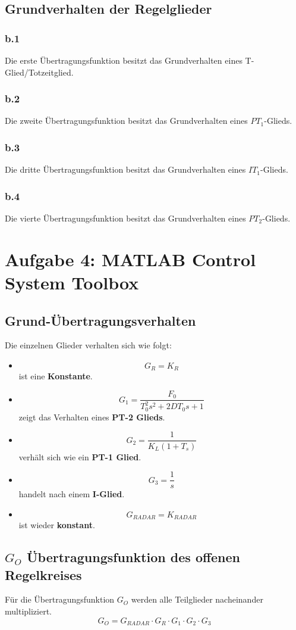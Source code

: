 \documentclass{article}
\begin{document}
		\subsection{Grundverhalten der Regelglieder}		
			\subsubsection{b.1}
				Die erste Übertragungsfunktion besitzt das Grundverhalten eines T-Glied/Totzeitglied.
			\subsubsection{b.2}
				Die zweite Übertragungsfunktion besitzt das Grundverhalten eines $PT_1$-Glieds.
			\subsubsection{b.3}
				Die dritte Übertragungsfunktion besitzt das Grundverhalten eines $IT_1$-Glieds.
			\subsubsection{b.4}
				Die vierte Übertragungsfunktion besitzt das Grundverhalten eines $PT_2$-Glieds. 
				
	\section{Aufgabe 4: MATLAB Control System Toolbox}
		\subsection{Grund-Übertragungsverhalten}
			Die einzelnen Glieder verhalten sich wie folgt:
			\begin{itemize}
				\item $$G_R = K_R$$ ist eine \textbf{Konstante}.
				\item $$G_1 = \frac{F_0}{T_0^2 s^2 + 2DT_0 s +1}$$ zeigt das Verhalten eines \textbf{PT-2 Glieds}.
				\item $$G_2 = \frac{1}{K_L (1+T_s)}$$ verhält sich wie ein \textbf{PT-1 Glied}.
				\item $$G_3 = \frac{1}{s}$$ handelt nach einem \textbf{I-Glied}.
				\item $$G_{RADAR} = K_{RADAR}$$ ist wieder \textbf{konstant}.
			\end{itemize}
		\subsection{$G_O$ Übertragungsfunktion des offenen Regelkreises}
			Für die Übertragungsfunktion $G_O$ werden alle Teilglieder nacheinander multipliziert.
			$$G_O = G_{RADAR} \cdot G_R \cdot G_1 \cdot G_2 \cdot G_3$$
		
\end{document}
